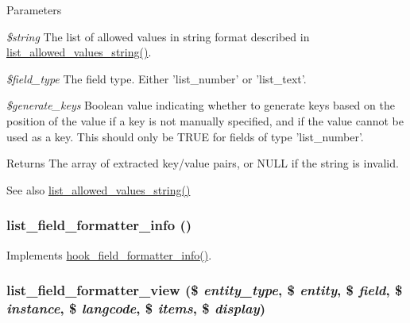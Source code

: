 \begin{DoxyParams}{Parameters}
\item[{\em \$string}]The list of allowed values in string format described in \hyperlink{list_8module_a398a1526738a574db51cad98a20b5590}{list\_\-allowed\_\-values\_\-string()}. \item[{\em \$field\_\-type}]The field type. Either 'list\_\-number' or 'list\_\-text'. \item[{\em \$generate\_\-keys}]Boolean value indicating whether to generate keys based on the position of the value if a key is not manually specified, and if the value cannot be used as a key. This should only be TRUE for fields of type 'list\_\-number'.\end{DoxyParams}
\begin{DoxyReturn}{Returns}
The array of extracted key/value pairs, or NULL if the string is invalid.
\end{DoxyReturn}
\begin{DoxySeeAlso}{See also}
\hyperlink{list_8module_a398a1526738a574db51cad98a20b5590}{list\_\-allowed\_\-values\_\-string()} 
\end{DoxySeeAlso}
\hypertarget{list_8module_a12250051f9751c4016a9e7fa0403223b}{
\subsubsection[{list\_\-field\_\-formatter\_\-info}]{\setlength{\rightskip}{0pt plus 5cm}list\_\-field\_\-formatter\_\-info ()}}
\label{list_8module_a12250051f9751c4016a9e7fa0403223b}
Implements \hyperlink{group__field__formatter_ga2f5aa1c7455f55dffd84a48efa57f987}{hook\_\-field\_\-formatter\_\-info()}. \hypertarget{list_8module_a8747111b6404b34d812a851224ea2062}{
\subsubsection[{list\_\-field\_\-formatter\_\-view}]{\setlength{\rightskip}{0pt plus 5cm}list\_\-field\_\-formatter\_\-view (\$ {\em entity\_\-type}, \/  \$ {\em entity}, \/  \$ {\em field}, \/  \$ {\em instance}, \/  \$ {\em langcode}, \/  \$ {\em items}, \/  \$ {\em display})}}
